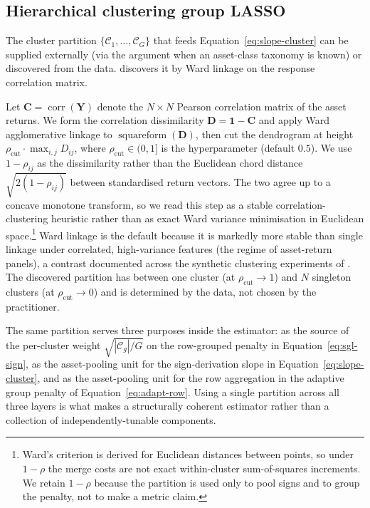 \documentclass[article]{jss}
\begin{document}
\subsection[Hierarchical clustering group LASSO]{Hierarchical clustering group LASSO} \label{sec:hcgl}

The cluster partition $\{\mathcal{C}_1, \ldots, \mathcal{C}_G\}$ that
feeds Equation~\ref{eq:slope-cluster} can be supplied externally (via
the  argument when an asset-class taxonomy is known) or
discovered from the data.  discovers it by Ward linkage
on the response correlation matrix.

Let $\bm{C} = \operatorname{corr}(\bm{Y})$ denote the $N \times N$
Pearson correlation matrix of the asset returns. We form the
correlation dissimilarity $\bm{D} = \mathbf{1} - \bm{C}$ and apply
Ward agglomerative linkage to $\operatorname{squareform}(\bm{D})$,
then cut the dendrogram at height
$\rho_{\mathrm{cut}} \cdot \max_{i,j}\!D_{ij}$, where
$\rho_{\mathrm{cut}} \in (0, 1]$ is the 
hyperparameter (default $0.5$). We use $1 - \rho_{ij}$ as the
dissimilarity rather than the Euclidean chord distance
$\sqrt{2(1 - \rho_{ij})}$ between standardised return vectors. The two
agree up to a concave monotone transform, so we read this step as a
stable correlation-clustering heuristic rather than as exact Ward
variance minimisation in Euclidean space.\footnote{Ward's criterion is
derived for Euclidean distances between points, so under $1 - \rho$ the
merge costs are not exact within-cluster sum-of-squares increments. We
retain $1 - \rho$ because the partition is used only to
pool signs and to group the penalty, not to make a metric claim.} Ward
linkage is the default because it
is markedly more stable than single linkage under correlated,
high-variance features (the regime of asset-return panels), a
contrast documented across the synthetic clustering experiments of
\citet{Sorooshyari+Rivas+Tibshirani:2026}. The discovered partition has between
one cluster (at $\rho_{\mathrm{cut}} \to 1$) and $N$ singleton clusters
(at $\rho_{\mathrm{cut}} \to 0$) and is determined by the data, not
chosen by the practitioner.

The same partition serves three purposes inside the estimator: as the
source of the per-cluster weight $\sqrt{|\mathcal{C}_g|/G}$ on the
row-grouped penalty in
Equation~\ref{eq:sgl-sign}, as the asset-pooling unit for the
sign-derivation slope in Equation~\ref{eq:slope-cluster}, and as the
asset-pooling unit for the row aggregation in the adaptive group
penalty of Equation~\ref{eq:adapt-row}. Using a single partition across
all three layers is what makes  a structurally
coherent estimator rather than a collection of independently-tunable
components.
\end{document}
